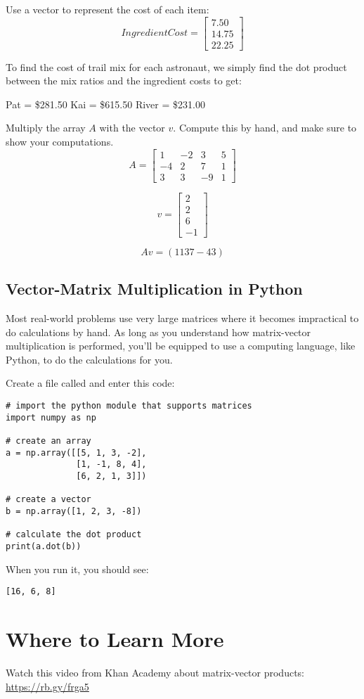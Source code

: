 Use a vector to represent the cost of each item:
$$IngredientCost = 
\begin{bmatrix}
7.50 \\
14.75 \\
22.25
\end{bmatrix}$$

To find the cost of trail mix for each astronaut, we simply find the dot product between the mix ratios and the ingredient costs to get:

Pat =  \$281.50 \newline
Kai =  \$615.50 \newline
River = \$231.00 \newline


\begin{Exercise}[title={Vector Matrix Multiplication}, label=vector-matrix-multiply01]
Multiply the array $A$ with the vector $v$. Compute this by hand, and make sure to show your computations. 
$$A = \begin{bmatrix}
1 & -2 & 3 & 5  \\
-4 & 2 & 7 & 1 \\
3 & 3  & -9 & 1
\end{bmatrix}$$

$$v = 
\begin{bmatrix}
 2 \\
 2 \\
 6 \\
 -1
 \end{bmatrix}$$
\end{Exercise}

\begin{Answer}[ref=vector-matrix-multiply01]
$$Av = (11 37 -43)$$
\end{Answer}

\subsection{Vector-Matrix Multiplication in Python}
Most real-world problems use very large matrices where it becomes impractical to do calculations by hand. As long as you understand how matrix-vector multiplication is performed, you'll be equipped to use a computing language, like Python, to do the calculations for you. 

Create a file called  and enter this code:

\begin{Verbatim}
# import the python module that supports matrices
import numpy as np

# create an array
a = np.array([[5, 1, 3, -2], 
              [1, -1, 8, 4], 
              [6, 2, 1, 3]])

# create a vector 
b = np.array([1, 2, 3, -8])

# calculate the dot product
print(a.dot(b))
\end{Verbatim}

When you run it, you should see:
\begin{Verbatim}
[16, 6, 8]
\end{Verbatim}

\section{Where to Learn More}
Watch this video from Khan Academy about matrix-vector products: \url{https://rb.gy/frga5}

